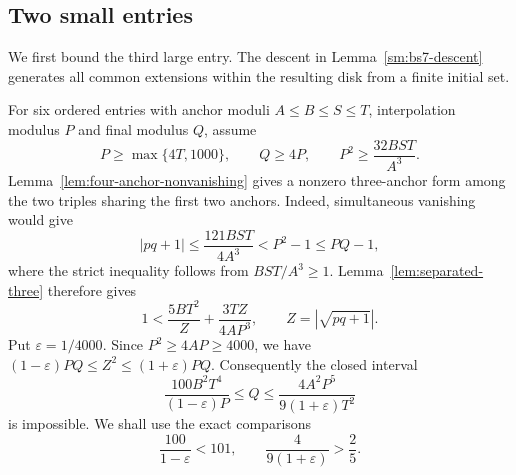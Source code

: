 \documentclass[12pt]{article}
\numberwithin{equation}{section}
\begin{document}
\subsection{Two small entries}

We first bound the third large entry. The descent in Lemma~\ref{sm:bs7-descent} generates all common extensions within the resulting disk from a finite initial set.

For six ordered entries with anchor moduli $A\le B\le S\le T$, interpolation modulus $P$ and final modulus $Q$, assume
\begin{equation}\label{sm:six-V-hypotheses}
 P\ge\max\{4T,1000\},\qquad Q\ge4P,
 \qquad P^2\ge\frac{32BST}{A^3}.
\end{equation}
Lemma~\ref{lem:four-anchor-nonvanishing} gives a nonzero three-anchor form among the two triples sharing the first two anchors. Indeed, simultaneous vanishing would give
\begin{equation*}
 |pq+1|\le\frac{121BST}{4A^3}
 <P^2-1\le PQ-1,
\end{equation*}
where the strict inequality follows from $BST/A^3\ge1$.
Lemma~\ref{lem:separated-three} therefore gives
\begin{equation*}
 1<\frac{5BT^2}{Z}+\frac{3TZ}{4AP^3},
 \qquad Z=|\sqrt{pq+1}|.
\end{equation*}
Put $\varepsilon=1/4000$. Since $P^2\ge4AP\ge4000$, we have
$(1-\varepsilon)PQ\le Z^2\le(1+\varepsilon)PQ$.
Consequently the closed interval
\begin{equation}\label{sm:six-V-interval}
 \frac{100B^2T^4}{(1-\varepsilon)P}\le Q
 \le\frac{4A^2P^5}{9(1+\varepsilon)T^2}
\end{equation}
is impossible. We shall use the exact comparisons
\begin{equation}\label{sm:six-V-constants}
 \frac{100}{1-\varepsilon}<101,
 \qquad \frac4{9(1+\varepsilon)}>\frac25.
\end{equation}
\end{document}
